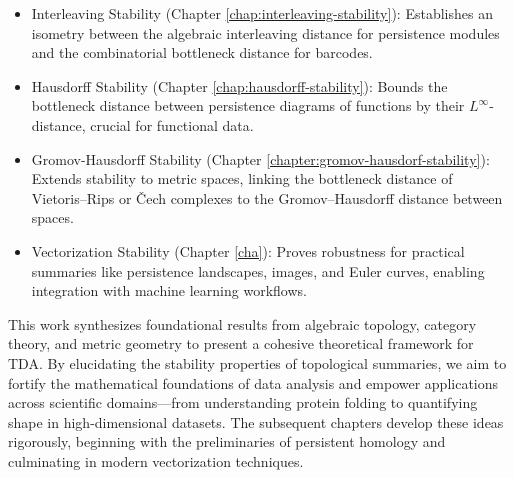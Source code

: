 \begin{itemize}
    \item Interleaving Stability (Chapter \ref{chap:interleaving-stability}): Establishes an isometry between the algebraic interleaving distance for persistence modules and the combinatorial bottleneck distance for barcodes.
    \item Hausdorff Stability (Chapter \ref{chap:hausdorff-stability}): Bounds the bottleneck distance between persistence diagrams of functions by their $L^{\infty}$-distance, crucial for functional data.
    \item Gromov-Hausdorff Stability (Chapter \ref{chapter:gromov-hausdorf-stability}): Extends stability to metric spaces, linking the bottleneck distance of Vietoris–Rips or Čech complexes to the Gromov–Hausdorff distance between spaces.
    \item Vectorization Stability (Chapter \ref{cha}): Proves robustness for practical summaries like persistence landscapes, images, and Euler curves, enabling integration with machine learning workflows.

\end{itemize}
This work synthesizes foundational results from algebraic topology, category theory, and metric geometry to present a cohesive theoretical framework for TDA. By elucidating the stability properties of topological summaries, we aim to fortify the mathematical foundations of data analysis and empower applications across scientific domains—from understanding protein folding to quantifying shape in high-dimensional datasets. The subsequent chapters develop these ideas rigorously, beginning with the preliminaries of persistent homology and culminating in modern vectorization techniques.